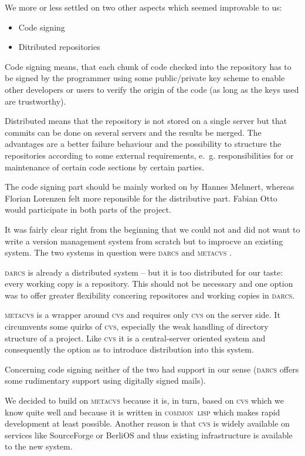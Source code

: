 \documentclass[fleqn, 10pt, a4paper]{report} \usepackage{amssymb}
\begin{document}
We more or less settled on two other aspects which seemed improvable
to us:

\begin{itemize}
\item Code signing
\item Ditributed repositories
\end{itemize}

Code signing means, that each chunk of code checked into the
repository has to be signed by the programmer using some
public/private key scheme to enable other developers or users to
verify the origin of the code (as long as the keys used are
trustworthy).

Distributed means that the repository is not stored on a single server
but that commits can be done on several servers and the results be
merged. The advantages are a better failure behaviour and the
possibility to structure the repositories according to some external
requirements, e.~g. responsibilities for or maintenance of certain
code sections by certain parties.

The code signing part should be mainly worked on by Hannes Mehnert,
whereas Florian Lorenzen felt more reponsible for the distributive
part. Fabian Otto would participate in both parts of the project.

It was fairly clear right from the beginning that we could not and did
not want to write a version management system from scratch but to
improcve an existing system. The two systems in question were
\textsc{darcs} \cite{Darc06} and \textsc{metacvs} \cite{Mcvs06}.

\textsc{darcs} is already a distributed system -- but it is too
distributed for our taste: every working copy is a repository.  This
should not be necessary and one option was to offer greater
flexibility concering repositores and working copies in
\textsc{darcs}.

\textsc{metacvs} is a wrapper around \textsc{cvs} \cite{Cvs06} and
requires only \textsc{cvs} on the server side. It circumvents some
quirks of \textsc{cvs}, especially the weak handling of directory
structure of a project. Like \textsc{cvs} it is a central-server
oriented system and consequently the option as to introduce
distribution into this system.

Concerning code signing neither of the two had support in our sense
(\textsc{darcs} offers some rudimentary support using digitally signed
mails).

We decided to build on \textsc{metacvs} because it is, in turn, based
on \textsc{cvs} which we know quite well and because it is written in
\textsc{common~lisp} which makes rapid development at least possible.
Another reason is that \textsc{cvs} is widely available on services
like SourceForge \cite{Sour06} or BerliOS \cite{Berl06} and thus
existing infrastructure is available to the new system.
\end{document}
